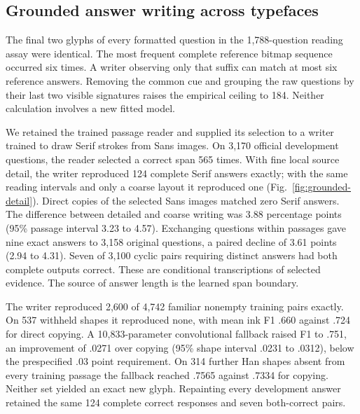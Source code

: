 \subsection*{Grounded answer writing across typefaces}
The final two glyphs of every formatted question in the 1,788-question
reading assay were identical. The most frequent complete reference bitmap
sequence occurred six times. A writer observing only that suffix can match
at most six reference answers. Removing the common cue and grouping the
raw questions by their last two visible signatures raises the empirical
ceiling to 184. Neither calculation involves a new fitted model.

We retained the trained passage reader and supplied its selection to a writer
trained to draw Serif strokes from Sans images. On 3,170 official development
questions, the reader selected a correct span 565 times. With fine local
source detail, the writer reproduced 124 complete Serif answers exactly;
with the same reading intervals and only a coarse layout it reproduced one
(Fig.~\ref{fig:grounded-detail}). Direct copies of the selected Sans images
matched zero Serif answers. The difference between detailed and coarse writing
was 3.88 percentage points (95\% passage interval 3.23 to 4.57).
Exchanging questions within passages gave nine exact answers to 3,158
original questions, a paired decline of 3.61 points (2.94 to 4.31).
Seven of 3,100 cyclic pairs requiring distinct answers had both complete
outputs correct. These are conditional transcriptions of selected evidence.
The source of answer length is the learned span boundary.

The writer reproduced 2,600 of 4,742 familiar nonempty training pairs exactly.
On 537 withheld shapes it reproduced none, with mean ink F1 .660 against .724
for direct copying. A 10,833-parameter convolutional fallback raised F1 to
.751, an improvement of .0271 over copying (95\% shape interval .0231 to
.0312), below the prespecified .03 point requirement. On 314 further Han
shapes absent from every training passage the fallback reached .7565 against
.7334 for copying. Neither set yielded an exact new glyph. Repainting every
development answer retained the same 124 complete correct responses and
seven both-correct pairs.
